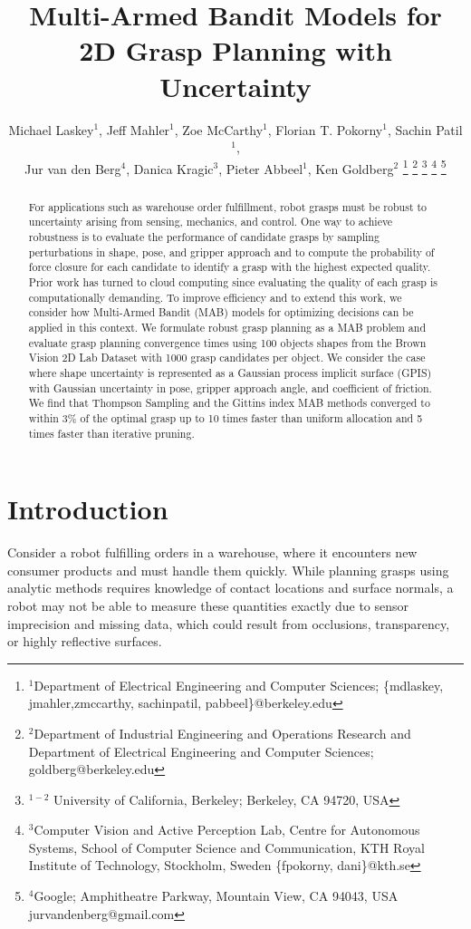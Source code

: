 \documentclass[10pt, conference]{ieeeconf}      %
\title{\LARGE \bf
Multi-Armed Bandit Models for 2D Grasp Planning with Uncertainty}
\author{Michael Laskey$^1$, Jeff Mahler$^1$, Zoe McCarthy$^1$,  Florian T. Pokorny$^1$, Sachin Patil$^1$,\\ Jur van den Berg$^4$,  Danica Kragic$^3$, Pieter Abbeel$^1$, Ken Goldberg$^2$%
\thanks{$^1$Department of Electrical Engineering and Computer Sciences; {\small \{mdlaskey, jmahler,zmccarthy, sachinpatil, pabbeel\}@berkeley.edu}}%
\thanks{$^2$Department of Industrial Engineering and Operations Research and Department of Electrical Engineering and Computer Sciences; {\small goldberg@berkeley.edu}}%
\thanks{$^{1-2}$ University of California, Berkeley;  Berkeley, CA 94720, USA}%
\thanks{$^3$Computer Vision and Active Perception Lab, Centre for Autonomous Systems, School of Computer Science and Communication, KTH Royal Institute of Technology, Stockholm, Sweden {\small \{fpokorny, dani\}@kth.se}}%
\thanks{$^4$Google; Amphitheatre Parkway, Mountain View, CA 94043, USA {\small jurvandenberg@gmail.com}}%
}
\begin{document}
\maketitle
\thispagestyle{empty}
\pagestyle{empty}



\begin{abstract}
For applications such as warehouse order fulfillment, robot grasps must be robust to uncertainty arising from sensing,
mechanics, and control.  One way to achieve robustness is to evaluate the performance of candidate grasps by sampling
perturbations in shape, pose, and gripper approach and to compute the probability of force closure for each candidate to
identify a grasp with the highest expected quality. Prior work has turned to cloud computing since evaluating the
quality of each grasp is computationally demanding. To improve efficiency and to extend this work, we consider how
Multi-Armed Bandit (MAB) models for optimizing decisions can be applied in this context. We formulate robust grasp
planning as a MAB problem and evaluate grasp planning convergence times using 100 objects shapes from
the Brown Vision 2D Lab Dataset with 1000 grasp candidates per object. We consider the case where shape uncertainty is represented as a Gaussian process implicit surface (GPIS) with Gaussian uncertainty in pose, gripper approach angle, and coefficient of friction. 
We find that Thompson Sampling and the Gittins index MAB methods converged to within 3\% of the optimal grasp up to 10
times faster than uniform allocation and 5 times faster than iterative pruning. 
\end{abstract}



\section{Introduction}



Consider a robot fulfilling orders in a warehouse, where it encounters new consumer products and must handle them quickly.
While planning grasps using analytic methods requires knowledge of contact locations and surface normals,
a robot may not be able to measure these quantities exactly due to sensor imprecision and missing data, which could result from occlusions, transparency, or highly reflective surfaces. 
\end{document}
